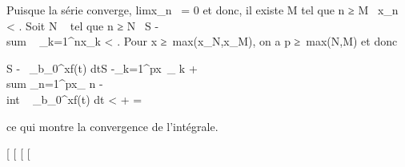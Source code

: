 \documentclass[]{article}
\begin{document}
Puisque la série converge, limx\_n~ = 0
et donc, il existe M tel que n ≥ M \rigtharrow~\textbar{}x\_n\textbar{}
\textless{} \epsilon {} . Soit N \in {}~ tel que n ≥ N
\rigtharrow~\textbar{}S -\\sum ~
\_k=1^nx\_k\textbar{} \textless{} \epsilon
{} . Pour x ≥\
max(x\_N,x\_M), on a p ≥\
max(N,M) et donc

\textbar{}S -\int ~
\_b\_0^xf(t) dt\textbar{}\leq\textbar{}S
-\sum \_k=1^px~\_
k\textbar{} + \textbar{}\\sum
\_n=1^px\_ n
-\\int  ~
\_b\_0^xf(t) dt\textbar{} \textless{} \epsilon
{} + \epsilon {} = \epsilon

ce qui montre la convergence de l'intégrale.

{[}
{[}
{[}
{[}
\end{document}
